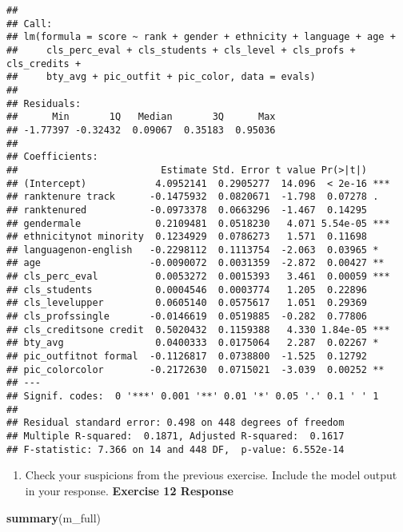 \documentclass[
]{article}
\newenvironment{Shaded}{\begin{snugshade}}{\end{snugshade}}
\newcommand{\FunctionTok}[1]{\textcolor[rgb]{0.13,0.29,0.53}{\textbf{#1}}}
\newcommand{\NormalTok}[1]{#1}
\providecommand{\tightlist}{%
  \setlength{\itemsep}{0pt}\setlength{\parskip}{0pt}}
\begin{document}
\begin{verbatim}
## 
## Call:
## lm(formula = score ~ rank + gender + ethnicity + language + age + 
##     cls_perc_eval + cls_students + cls_level + cls_profs + cls_credits + 
##     bty_avg + pic_outfit + pic_color, data = evals)
## 
## Residuals:
##      Min       1Q   Median       3Q      Max 
## -1.77397 -0.32432  0.09067  0.35183  0.95036 
## 
## Coefficients:
##                         Estimate Std. Error t value Pr(>|t|)    
## (Intercept)            4.0952141  0.2905277  14.096  < 2e-16 ***
## ranktenure track      -0.1475932  0.0820671  -1.798  0.07278 .  
## ranktenured           -0.0973378  0.0663296  -1.467  0.14295    
## gendermale             0.2109481  0.0518230   4.071 5.54e-05 ***
## ethnicitynot minority  0.1234929  0.0786273   1.571  0.11698    
## languagenon-english   -0.2298112  0.1113754  -2.063  0.03965 *  
## age                   -0.0090072  0.0031359  -2.872  0.00427 ** 
## cls_perc_eval          0.0053272  0.0015393   3.461  0.00059 ***
## cls_students           0.0004546  0.0003774   1.205  0.22896    
## cls_levelupper         0.0605140  0.0575617   1.051  0.29369    
## cls_profssingle       -0.0146619  0.0519885  -0.282  0.77806    
## cls_creditsone credit  0.5020432  0.1159388   4.330 1.84e-05 ***
## bty_avg                0.0400333  0.0175064   2.287  0.02267 *  
## pic_outfitnot formal  -0.1126817  0.0738800  -1.525  0.12792    
## pic_colorcolor        -0.2172630  0.0715021  -3.039  0.00252 ** 
## ---
## Signif. codes:  0 '***' 0.001 '**' 0.01 '*' 0.05 '.' 0.1 ' ' 1
## 
## Residual standard error: 0.498 on 448 degrees of freedom
## Multiple R-squared:  0.1871, Adjusted R-squared:  0.1617 
## F-statistic: 7.366 on 14 and 448 DF,  p-value: 6.552e-14
\end{verbatim}

\begin{enumerate}
\def\labelenumi{\arabic{enumi}.}
\setcounter{enumi}{11}
\tightlist
\item
  Check your suspicions from the previous exercise. Include the model
  output in your response. \textbf{Exercise 12 Response}
\end{enumerate}

\begin{Shaded}
\begin{Highlighting}[]
\FunctionTok{summary}\NormalTok{(m\_full)}
\end{Highlighting}
\end{Shaded}
\end{document}
